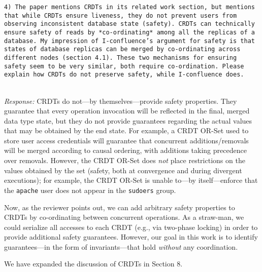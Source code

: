 \documentclass[10pt]{article}
\newcommand{\reviewer}[1] {\noindent\colorbox{reviewercolor}{\parbox{\textwidth}{\noindent\texttt{#1}}}\\}
\newcommand{\response}[1] {\noindent\textit{Response: } #1\\}
\begin{document}
  \reviewer{4) The paper mentions CRDTs in its related work section, but mentions that while CRDTs ensure liveness, they do not prevent users from observing inconsistent database state (safety). CRDTs can technically ensure safety of reads by *co-ordinating* among all the replicas of a database. My impression of I-confluence's argument for safety is that states of database replicas can be merged by co-ordinating across different nodes (section 4.1). These two mechanisms for ensuring safety seem to be very similar, both require co-ordination. Please explain how CRDTs do not preserve safety, while I-confluence does. }

  \response{CRDTs do not---by themselves---provide safety
    properties. They guarantee that every operation invocation will be
    reflected in the final, merged data type state, but they do not
    provide guarantees regarding the actual values that may be
    obtained by the end state. For example, a CRDT OR-Set used to
    store user access credentials will guarantee that concurrent
    additions/removals will be merged according to causal ordering,
    with additions taking precedence over removals. However, the CRDT
    OR-Set does \textit{not} place restrictions on the values obtained
    by the set (safety, both at convergence and during divergent
    executions); for example, the CRDT OR-Set is unable to---by
    itself---enforce that the \texttt{apache} user does not appear in
    the \texttt{sudoers} group.

    Now, as the reviewer points out, we can add arbitrary safety
    properties to CRDTs by co-ordinating between concurrent
    operations. As a straw-man, we could serialize all accesses to
    each CRDT (e.g., via two-phase locking) in order to provide
    additional safety guarantees. However, our goal in this work is to
    identify guarantees---in the form of invariants---that hold
    \textit{without} any coordination.

    We have expanded the discussion of CRDTs in Section 8.}
\end{document}
